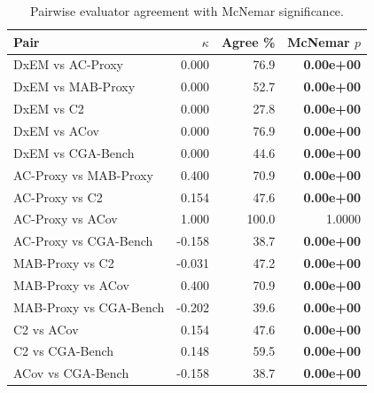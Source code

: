 \begin{table}[htbp]
\centering
\caption{Pairwise evaluator agreement with McNemar significance.}
\label{tab:evaluator-agreement}
\begin{tabular}{lrrr}
\toprule
Pair & $\kappa$ & Agree \% & McNemar $p$ \\
\midrule
DxEM vs AC-Proxy & 0.000 & 76.9 & \textbf{0.00e+00} \\
DxEM vs MAB-Proxy & 0.000 & 52.7 & \textbf{0.00e+00} \\
DxEM vs C2 & 0.000 & 27.8 & \textbf{0.00e+00} \\
DxEM vs ACov & 0.000 & 76.9 & \textbf{0.00e+00} \\
DxEM vs CGA-Bench & 0.000 & 44.6 & \textbf{0.00e+00} \\
AC-Proxy vs MAB-Proxy & 0.400 & 70.9 & \textbf{0.00e+00} \\
AC-Proxy vs C2 & 0.154 & 47.6 & \textbf{0.00e+00} \\
AC-Proxy vs ACov & 1.000 & 100.0 & 1.0000 \\
AC-Proxy vs CGA-Bench & -0.158 & 38.7 & \textbf{0.00e+00} \\
MAB-Proxy vs C2 & -0.031 & 47.2 & \textbf{0.00e+00} \\
MAB-Proxy vs ACov & 0.400 & 70.9 & \textbf{0.00e+00} \\
MAB-Proxy vs CGA-Bench & -0.202 & 39.6 & \textbf{0.00e+00} \\
C2 vs ACov & 0.154 & 47.6 & \textbf{0.00e+00} \\
C2 vs CGA-Bench & 0.148 & 59.5 & \textbf{0.00e+00} \\
ACov vs CGA-Bench & -0.158 & 38.7 & \textbf{0.00e+00} \\
\bottomrule
\end{tabular}
\end{table}
